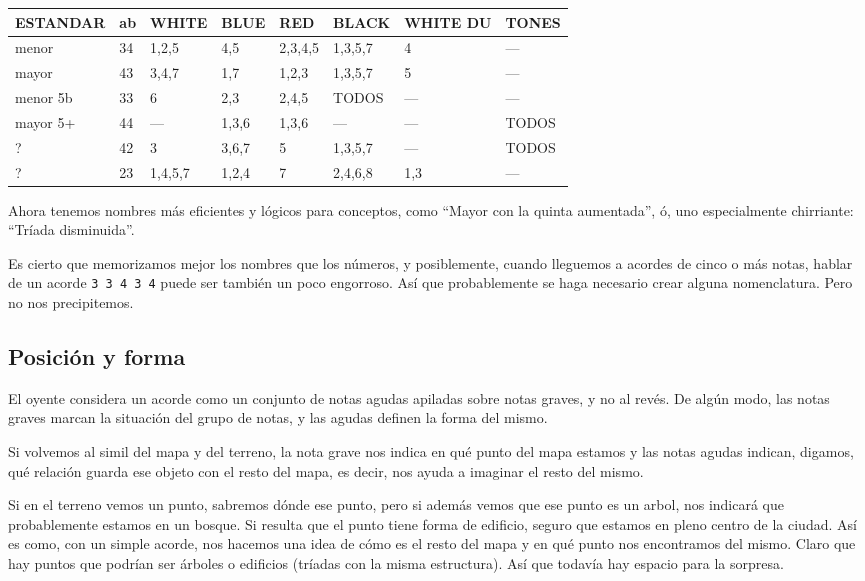 \documentclass[]{report}
\begin{document}
\begin{table}[H]
	\centering
	\begingroup\setlength{\tabcolsep}{3pt}\small
	\begin{tabular}{|l|l|l|l|l|l|l|l|}
		\hline
		ESTANDAR & ab & WHITE   & BLUE  & RED     & BLACK   & WHITE DU & TONES \\
		\hline
		menor    & 34 & 1,2,5   & 4,5   & 2,3,4,5 & 1,3,5,7 & 4     & ---   \\
		\hline
		mayor    & 43 & 3,4,7   & 1,7   & 1,2,3   & 1,3,5,7 & 5     & ---   \\
		\hline
		menor 5b & 33 & 6       & 2,3   & 2,4,5   & TODOS   & ---   & ---   \\
		\hline
		mayor 5+ & 44 & ---     & 1,3,6 & 1,3,6   & ---     & ---   & TODOS \\
		\hline
		?        & 42 & 3       & 3,6,7 & 5       & 1,3,5,7 & ---   & TODOS \\
		\hline
		?        & 23 & 1,4,5,7 & 1,2,4 & 7       & 2,4,6,8 & 1,3   & ---   \\
		\hline
	\end{tabular}
	\endgroup
\end{table}


Ahora tenemos nombres más eficientes y lógicos para conceptos, como ``Mayor con la quinta aumentada'', ó, uno especialmente chirriante: ``Tríada disminuida''.

Es cierto que memorizamos mejor los nombres que los números, y posiblemente, cuando lleguemos a acordes de cinco o más notas, hablar de un acorde \texttt{3\ 3\ 4\ 3\ 4} puede ser también un poco engorroso. Así que probablemente se haga necesario crear alguna nomenclatura. Pero no nos precipitemos.

\subsection{Posición y forma}

El oyente considera un acorde como un conjunto de notas agudas apiladas sobre notas graves, y no al revés. De algún modo, las notas graves marcan la situación del grupo de notas, y las agudas definen la forma del mismo.

Si volvemos al simil del mapa y del terreno, la nota grave nos indica en qué punto del mapa estamos y las notas agudas indican, digamos, qué relación guarda ese objeto con el resto del mapa, es decir, nos ayuda a imaginar el resto del mismo.

Si en el terreno vemos un punto, sabremos dónde ese punto, pero si además vemos que ese punto es un arbol, nos indicará que probablemente estamos en un bosque. Si resulta que el punto tiene forma de edificio, seguro que estamos en pleno centro de la ciudad. Así es como, con un simple acorde, nos hacemos una idea de cómo es el resto del mapa y en qué punto nos encontramos del mismo. Claro que hay puntos que podrían ser árboles o edificios (tríadas con la misma estructura). Así que todavía hay espacio para la sorpresa.
\end{document}
